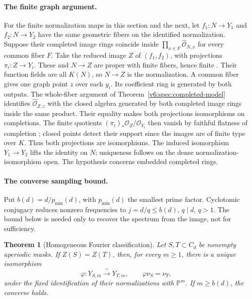 \documentclass[10pt,fleqn]{article}
\numberwithin{equation}{section}
\newtheorem{theorem}{Theorem}[section]
\newcommand{\PP}{\mathbb P}
\begin{document}
\paragraph{The finite graph argument.}
For the finite normalization maps in this section and the next, let
$f_1:N\to Y_1$ and $f_2:N\to Y_2$ have the same geometric fibers
on the identified normalization.  Suppose their completed image rings
coincide inside $\prod_{x\in F}\widehat{\mathcal O}_{N,x}$ for
every common fiber $F$.  Take the reduced image $Z$ of $(f_1,f_2)$, with projections
$\pi_i:Z\to Y_i$.  These and $N\to Z$ are proper with finite fibers,
hence finite \cite[Tag~02LS]{Stacks}.  Their function fields are all $K(N)$, so $N\to Z$
is the normalization.  A common fiber gives one graph point $z$ over each $y_i$.  Its
coefficient ring is generated by both outputs.  The whole-fiber
argument of Theorem~\ref{v6:spec:completed-model} identifies
$\widehat{\mathcal O}_{Z,z}$ with the closed algebra generated by
both completed image rings inside the same product.  Their equality makes both projections
isomorphisms on completions.  The finite quotients
$(\pi_i)_*\mathcal O_Z/\mathcal O_{Y_i}$ then vanish by
faithful flatness of completion \cite[Tag~00MC]{Stacks}; closed points detect
their support since the images are of finite type over $K$.
Thus both projections are isomorphisms.  The induced isomorphism $Y_1\to Y_2$ lifts the identity on $N$;
uniqueness follows on the dense normalization-isomorphism open.
The hypothesis concerns embedded completed rings.

\paragraph{The converse sampling bound.}
Put $b(d)=d/p_{\min}(d)$, with $p_{\min}(d)$ the smallest prime
factor.  Cyclotomic conjugacy reduces nonzero frequencies to
$j=d/q\le b(d)$, $q\mid d$, $q>1$.  The bound below is needed
only to recover the spectrum from the image, not for sufficiency.


\begin{theorem}[Homogeneous Fourier classification]
\label{v6:spec:homogeneous-classification}
Let $S,T\subset C_d$ be nonempty aperiodic masks.  If $Z(S)=Z(T)$,
then, for every $m\ge1$, there is a unique isomorphism
\begin{equation}\label{v6:spec:marked-isomorphism}
 \varphi:Y_{S,m}\xrightarrow{\ \sim\ }Y_{T,m},\qquad
 \varphi\nu_S=\nu_T,
\end{equation}
under the fixed identification of their normalizations with $\PP^m$.
If $m\ge b(d)$, the converse holds.
\end{theorem}
\end{document}
